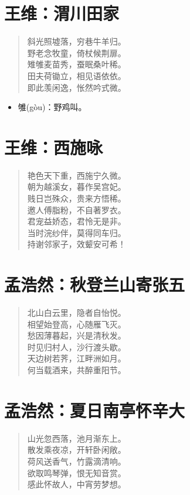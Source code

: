 \documentclass[12pt,oneside]{book}
\newenvironment{shici}{%
\begin{verse}\centering\yanti\large\hspace{12pt}}{\end{verse}}
\begin{document}
\begin{common-format}
\chapter{王维：渭川田家}
\begin{shici}
斜光照墟落，穷巷牛羊归。\\
野老念牧童，倚杖候荆扉。\\
雉雊麦苗秀，蚕眠桑叶稀。\\
田夫荷锄立，相见语依依。\\
即此羡闲逸，怅然吟式微。
\end{shici}


\begin{itemize}
\item 雊(gòu)：野鸡叫。
\end{itemize}

\chapter{王维：西施咏}
\begin{shici}
艳色天下重，西施宁久微。\\
朝为越溪女，暮作吴宫妃。\\
贱日岂殊众，贵来方悟稀。\\
邀人傅脂粉，不自著罗衣。\\
君宠益娇态，君怜无是非。\\
当时浣纱伴，莫得同车归。\\
持谢邻家子，效颦安可希！
\end{shici}

\chapter{孟浩然：秋登兰山寄张五}
\begin{shici}
北山白云里，隐者自怡悦。\\
相望始登高，心随雁飞灭。\\
愁因薄暮起，兴是清秋发。\\
时见归村人，沙行渡头歇。\\
天边树若荠，江畔洲如月。\\
何当载酒来，共醉重阳节。
\end{shici}

\chapter{孟浩然：夏日南亭怀辛大}
\begin{shici}
山光忽西落，池月渐东上。\\
散发乘夜凉，开轩卧闲敞。\\
荷风送香气，竹露滴清响。\\
欲取鸣琴弹，恨无知音赏。\\
感此怀故人，中宵劳梦想。
\end{shici}


\end{common-format}
\end{document}
